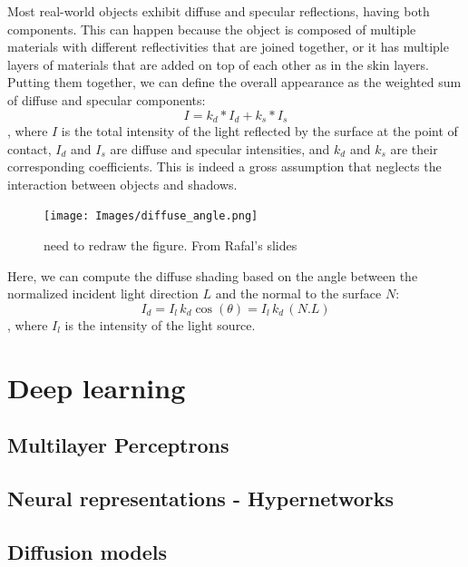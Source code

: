 Most real-world objects exhibit diffuse and specular reflections, having both components. This can happen because the object is composed of multiple materials with different reflectivities that are joined together, or it has multiple layers of materials that are added on top of each other as in the skin layers. Putting them together, we can define the overall appearance as the weighted sum of diffuse and specular components: $$I = k_d * I_d + k_s * I_s$$, where $I$ is the total intensity of the light reflected by the surface at the point of contact, $I_d$ and $I_s$  are diffuse and specular intensities, and $k_d$ and $k_s$ are their corresponding coefficients. This is indeed a gross assumption that neglects the interaction between objects and shadows.


\begin{figure}
  \centering
   \texttt{[image: Images/diffuse\_angle.png]}
   \caption{need to redraw the figure. From Rafal's slides}
   \label{fig:diffuse-comp}
\end{figure}

Here, we can compute the diffuse shading based on the angle between the normalized incident light direction $L$ and the normal to the surface $N$:
$$I_d = I_l \, k_d \cos(\theta) = I_l \, k_d \, (N . L)$$,  where $I_l$ is the intensity of the light source.



\section{Deep learning}
\subsection{Multilayer Perceptrons}
\subsection{Neural representations - Hypernetworks}
\subsection{Diffusion models}